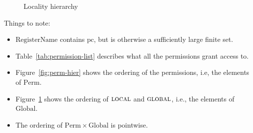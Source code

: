 \documentclass[a4paper]{article}
\newcommand{\pcreg}{\mathrm{pc}}
\newcommand{\plaindom}[1]{\mathrm{#1}}
\newcommand{\RegName}{\plaindom{RegisterName}}
\newcommand{\Perms}{\plaindom{Perm}}
\newcommand{\Globals}{\plaindom{Global}}
\newcommand{\plainperm}[1]{\textsc{#1}}
\newcommand{\local}{\plainperm{local}}
\newcommand{\glob}{\plainperm{global}}
\begin{document}
\begin{figure}[!h]
  \centering
  \caption{Locality hierarchy}
  \label{fig:glob-hier}
\end{figure}

Things to note:
\begin{itemize}
\item $\RegName$ contains $\pcreg$, but is otherwise a sufficiently
  large finite set.
\item Table~\ref{tab:permission-list} describes what all the permissions grant access to.
\item Figure~\ref{fig:perm-hier} shows the ordering of the permissions, i.e, the elements of $\Perms$.
\item Figure~\ref{fig:glob-hier} shows the ordering of $\local$ and $\glob$, i.e., the elements of $\Globals$.
\item The ordering of $\Perms \times \Globals$ is pointwise.
\end{itemize}
\end{document}
